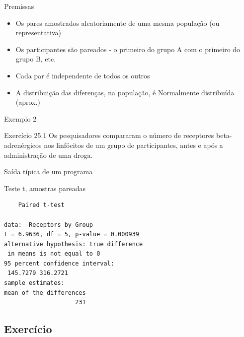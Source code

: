 \documentclass{beamer}
\begin{document}
\begin{frame}{Premissas}
  \begin{itemize}
  \item Os pares amostrados aleatoriamente de uma mesma população (ou representativa)
  \item Os participantes são pareados - o primeiro do grupo A com o primeiro do grupo B, etc.
  \item Cada par é independente de todos os outros
  \item A distribuição das diferenças, na população, é Normalmente distribuída (aprox.)
  \end{itemize}
\end{frame}

\begin{frame}{Exemplo 2}
  \begin{exampleblock}{Exercício 25.1}
    \small
    Os pesquisadores compararam o número de receptores beta-adrenérgicos nos linfócitos de um grupo de participantes, antes e após a administração de uma droga.

  \end{exampleblock}
\end{frame}

\begin{frame}[fragile]{Saída típica de um programa}
  \begin{exampleblock}{Teste t, amostras pareadas}
    \footnotesize
\begin{verbatim}
	Paired t-test

data:  Receptors by Group
t = 6.9636, df = 5, p-value = 0.000939
alternative hypothesis: true difference
 in means is not equal to 0
95 percent confidence interval:
 145.7279 316.2721
sample estimates:
mean of the differences 
                    231
\end{verbatim}
  \end{exampleblock}
\end{frame}

\subsection{Exercício}
\end{document}
